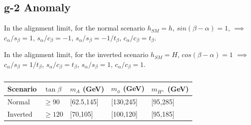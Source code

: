 \subsection{g-2 Anomaly}

In the alignment limit, for the normal scenario $h_{SM}=h$, $sin(\beta-\alpha)=1$, $\implies$ $c_{\alpha}/s_{\beta}=1$, $s_{\alpha}/c_{\beta}=-1$, $s_{\alpha}/s_{\beta}=-1/t_{\beta}$, $c_{\alpha}/c_{\beta}=t_{\beta}$.

In the alignment limit, for the inverted scenario $h_{SM}=H$, $cos(\beta-\alpha)=1$ $\implies$ $c_{\alpha}/s_{\beta}=1/t_{\beta}$, $s_{\alpha}/c_{\beta}=t_{\beta}$, $s_{\alpha}/s_{\beta}=1$, $c_{\alpha}/c_{\beta}=1$.


\begin{table}[H]
    \centering
    \begin{tabular}{p{1.5cm}|x{2.2cm}x{2.2cm}x{2.2cm}x{2.2cm}}
         \hline
         Scenario & $\tan\beta$ & $m_{A}$ (GeV) & $m_{\phi}$ (GeV) & $m_{H^{\pm}}$ (GeV) \\
         \hline
         \hline
         Normal & $\geq 90$ & [62.5,145] & [130,245] & [95,285] \\
         Inverted & $\geq 120$ & [70,105] & [100,120] & [95,185] \\
         \hline
    \end{tabular}
    \caption{}
    \label{tab:gm2region}
\end{table}